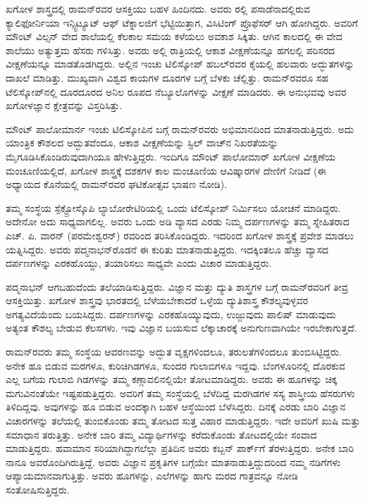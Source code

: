 ಖಗೋಳ ಶಾಸ್ತ್ರದಲ್ಲಿ ರಾಮನ್‌ರವರ ಆಸಕ್ತಿಯು ಬಹಳ ಹಿಂದಿನದು. ಅವರು  ರಲ್ಲಿ ಪಸಾಡೆನಾದಲ್ಲಿರುವ ಕ್ಯಾಲಿಫೋರ್ನಿಯಾ ಇನ್ಸ್ಟಿಟ್ಯೂಟ್ ಆಫ್ ಟೆಕ್ನಾಲಜಿಗೆ ಭೆಟ್ಟಿಯಿತ್ತಾಗ, ವಿಸಿಟಿಂಗ್ ಪ್ರೊಫೆಸರ್ ಆಗಿ ಹೋಗಿದ್ದರು. ಅವರಿಗೆ ಮೌಂಟ್ ವಿಲ್ಸನ್ ವೇದ ಶಾಲೆಯಲ್ಲಿ ಕೆಲಕಾಲ ಸಮಯ ಕಳೆಯಲು ಅವಕಾಶ ಸಿಕ್ಕಿತು. ಆಗಿನ ಕಾಲದಲ್ಲಿ ಈ ವೇದ ಶಾಲೆಯು ಅತ್ಯುತ್ತಮ ಹೆಸರು ಗಳಿಸಿತ್ತು. ಅವರು ಅಲ್ಲಿ ರಾತ್ರಿಯಲ್ಲಿ ಆಕಾಶ ವೀಕ್ಷಣೆಯನ್ನೂ ಹಗಲಲ್ಲಿ ಪರಿಸರದ ವೀಕ್ಷಣೆಯನ್ನೂ ಮಾಡತೊಡಗಿದ್ದರು. ಅಲ್ಲಿನ  ಇಂಚು ಟಿಲಿಸ್ಕೋಪ್ ಹಬಲ್‌ರವರ ಕೈಯಲ್ಲಿ ಹಲವಾರು ಅದ್ಭುತಗಳನ್ನು ದಾಖಲೆ ಮಾಡಿತ್ತು. ಮುಖ್ಯವಾಗಿ ವಿಶ್ವದ ಕಾಯಗಳ ದೂರಗಳ ಬಗ್ಗೆ ಬೆಳಕು ಚೆಲ್ಲಿತ್ತು. ರಾಮನ್‌ರವರೂ ಸಹ ಟೆಲಿಸ್ಕೋಪ್‌ನಲ್ಲಿ ದೂರ\enginline{-}ದೂರದ ಅನಿಲ ರೂಪದ ನೆಬ್ಯೂಲೊಗಳನ್ನು ವೀಕ್ಷಣೆ ಮಾಡಿದರು. ಈ ಅನುಭವವು ಅವರ ಖಗೋಳಜ್ಞಾನ ಕ್ಷೇತ್ರವನ್ನು ವಿಸ್ತರಿಸಿತ್ತು.

ಮೌಂಟ್ ಪಾಲೋಮಾರ್ನ  ಇಂಚು ಟಿಲಿಸ್ಕೋಪಿನ ಬಗ್ಗೆ ರಾಮನ್‌ರವರು ಅಭಿಮಾನದಿಂದ ಮಾತನಾಡುತ್ತಿದ್ದರು. ಅದು ಯಾಂತ್ರಿಕ ಕೌಶಲದ ಅದ್ಭುತವೆಂದೂ, ಆಕಾಶ ವೀಕ್ಷಣೆಯನ್ನು ಸ್ಟಿಲ್ ವಾಚ್‍ನ ನಿಖರತೆಯನ್ನು ಮೈಗೂಡಿಸಿಕೊಂಡಿರುವುದಾಗಿಯೂ ಹೇಳುತ್ತಿದ್ದರು. ಇಂದಿಗೂ ಮೌಂಟ್ ಪಾಲೋಮಾರ್ ಖಗೋಳ ವೀಕ್ಷಣೆಯ ಮಂಚೂಣಿಯಲ್ಲಿದೆ, ಖಗೋಳ ಶಾಸ್ತ್ರಕ್ಕೆ ದಶಕಗಳ ಕಾಲ ಮಂಚೂಣಿಯ ಆವಿಷ್ಕಾರಗಳ ದೇಣಿಗೆ ನೀಡಿದೆ (ಈ ಅಧ್ಯಾಯದ ಕೊನೆಯಲ್ಲಿ ರಾಮನ್‌ರವರ ಘಟಿಕೋತ್ಸವ ಭಾಷಣ ನೋಡಿ).

ತಮ್ಮ ಸಂಸ್ಥೆಯ ಸ್ಪೆಕ್ಟ್ರೋಸ್ಕೊಪಿ ಲ್ಯಾಬೋರೇಟಿರಿಯಲ್ಲಿ ಒಂದು ಟೆಲಿಸ್ಕೋಪ್ ನಿರ್ಮಿಸಲು ಯೋಚನೆ ಮಾಡಿದ್ದರು. ಅದೇನೋ ಅದು ಸಾಧ್ಯವಾಗಲಿಲ್ಲ. ಅವರು ಒಂದು ಅಡಿ ವ್ಯಾಸದ ಎರಡು ನಿಮ್ಮ ದರ್ಪಣಗಳನ್ನು ತಮ್ಮ ಸ್ನೇಹಿತರಾದ ಎಚ್. ಪಿ. ವಾರನ್ (ಪರಮೇಶ್ವರನ್) ರವರಿಂದ ತರಿಸಿಕೊಂಡಿದ್ದರು. ಇದರಿಂದ ಖಗೋಳ ಶಾಸ್ತ್ರಕ್ಕೆ ಪ್ರವೇಶ ಮಾಡಲು ಯತ್ನಿಸಿದ್ದರು. ಅವರು ಪದ್ಮನಾಭನ್‌ರೊಡನೆ ಈ ಕುರಿತು ಮಾತನಾಡುತ್ತಿದ್ದರು. ಇದಕ್ಕಿಂತಲೂ ಹೆಚ್ಚು ವ್ಯಾಸದ ದರ್ಪಣಗಳನ್ನು ಎರಕಹೊಯ್ದು, ತಯಾರಿಸಲು ಸಾಧ್ಯವೇ ಎಂದು ವಿಚಾರ ಮಾಡುತ್ತಿದ್ದರು. 

ಪದ್ಮನಾಭನ್ ಆಗಬಹುದೆಂದು ತಲೆಯಾಡಿಸುತ್ತಿದ್ದರು. ವಿಜ್ಞಾನ ಮತ್ತು ದ್ಯುತಿ ಶಾಸ್ತ್ರಗಳ ಬಗ್ಗೆ ರಾಮನ್‍ರವರಿಗೆ ತೀವ್ರ ಆಸಕ್ತಿಯಿತ್ತು. ಖಗೋಳ ಶಾಸ್ತ್ರವು ಭಾರತದಲ್ಲಿ ಬೆಳೆಯಬೇಕಾದರೆ ಒಳ್ಳೆಯ ದ್ಯುತಿಶಾಸ್ತ್ರ ಕೌಶಲ್ಯವುಳ್ಳವರ ಅಗತ್ಯವಿದೆಯೆಂದು ಬಯಸಿದ್ದರು. ದರ್ಪಣಗಳನ್ನು ಎರಕಹೊಯ್ಯುವುದು, ಉಜ್ಜುವುದು ಪಾಲಿಷ್ ಮಾಡುವುದು ಅತ್ಯಂತ ಕೌಶಲ್ಯ ಬೇಡುವ ಕೆಲಸಗಳು. ಇವು ವಿಜ್ಞಾನ ಬಯಸುವ ಲೆಕ್ಕಾಚಾರಕ್ಕೆ ಅನುಗುಣವಾಗಿಯೇ ಇರಬೇಕಾಗುತ್ತದೆ.

ರಾಮನ್‌ರವರು ತಮ್ಮ ಸಂಸ್ಥೆಯ ಆವರಣವನ್ನು ಅದ್ಭುತ ವೃಕ್ಷಗಳಿಂದಲೂ, ತರುಲತೆಗಳಿಂದಲೂ ತುಂಬಿಸಿಟ್ಟಿದ್ದರು. ಅನೇಕ ಹೂ ಬಿಡುವ ಮರಗಳೂ, ಕುರಿಚಿಗಿಡಗಳೂ, ಸುಂದರ ಗುಲಾಬಿಗಳೂ ಇದ್ದವು. ಬೆಂಗಳೂರಿನಲ್ಲಿ ದೊರಕುವ ಎಲ್ಲ ಬಗೆಯ ಗುಲಾಬಿ ಗಿಡಗಳನ್ನು ತಮ್ಮ ಕಣ್ಗಾವಲಿನಲ್ಲಿಯೇ ತೋಟಮಾಡಿದ್ದರು. ಅವರು ಈ ಹೂಗಳನ್ನು ಚಿಕ್ಕ ಮಗುವಿನಂತೆಯೇ ಇಷ್ಟಪಡುತ್ತಿದ್ದರು. ಅವರಿಗೆ ತಮ್ಮ ಸಂಸ್ಥೆಯಲ್ಲಿ ಬೆಳೆದಿದ್ದ ಮರಗಿಡಗಳ ಸಸ್ಯ ಶಾಸ್ತ್ರೀಯ ಹೆಸರುಗಳು ತಿಳಿದಿದ್ದವು. ಅವುಗಳನ್ನು ಹೂ ಬಿಡುವ ಅಂದಕ್ಕಾಗಿ ಬಹಳ ಆಸ್ಥೆಯಿಂದ ಬೆಳೆಸಿದ್ದರು. ದಿನಕ್ಕೆ ಎರಡು ಬಾರಿ ವಿಜ್ಞಾನ ವಿಚಾರಗಳನ್ನು ತಲೆಯಲ್ಲಿ ತುಂಬಿಕೊಂಡು ತಮ್ಮ ತೋಟದ ಸುತ್ತ ವಿಹಾರ ಮಾಡುತ್ತಿದ್ದರು. ಇದೇ ಅವರಿಗೆ ಖುಷಿ ಮತ್ತು ಸಮಾಧಾನ ತರುತ್ತಿತ್ತು. ಅನೇಕ ಬಾರಿ ತಮ್ಮ ವಿದ್ಯಾರ್ಥಿಗಳನ್ನು ಕರೆದುಕೊಂಡು ತೋಟದಲ್ಲಿಯೇ ಸಂವಾದ ಮಾಡುತ್ತಿದ್ದರು. ಹವಾಮಾನ ಸರಿಯಾಗಿದ್ದಾಗಲೆಲ್ಲಾ ಪ್ರತಿದಿನ ಅವರು ಕಬ್ಬನ್ ಪಾರ್ಕ್‌ಗೆ ತೆರಳುತ್ತಿದ್ದರು. ಅನೇಕ ಬಾರಿ ನಾನೂ ಅವರೊಂದಿಗಿರುತ್ತಿದ್ದೆ. ಅವರು ವಿಜ್ಞಾನ ಪ್ರಕೃತಿಗಳ ಬಗ್ಗೆಯೇ ಮಾತನಾಡುತ್ತಿದ್ದುದರಿಂದ ನಮ್ಮ ನಡಿಗೆಗಳು ಆಪ್ಯಾಯಮಾನವಾಗುತ್ತಿತ್ತು. ಅವರು ಹೂಗಳನ್ನು, ಎಲೆಗಳನ್ನು ಹಾಗು ಮರದ ಗಾತ್ರವನ್ನೂ ನೋಡಿ ಸಂತೋಷಿಸುತ್ತಿದ್ದರು. 

